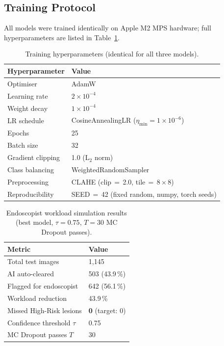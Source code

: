 \documentclass[11pt,a4paper]{article}
\begin{document}
\subsection{Training Protocol}
\label{sec:training}

All models were trained identically on Apple M2 MPS hardware; full
hyperparameters are listed in Table~\ref{tab:hparams}.

\begin{table}[H]
\centering
\caption{Training hyperparameters (identical for all three models).}
\label{tab:hparams}
\begin{tabular}{ll}
\toprule
\textbf{Hyperparameter} & \textbf{Value}\\
\midrule
Optimiser          & AdamW\\
Learning rate      & $2\times10^{-4}$\\
Weight decay       & $1\times10^{-4}$\\
LR schedule        & CosineAnnealingLR ($\eta_{\min}=1\times10^{-6}$)\\
Epochs             & 25\\
Batch size         & 32\\
Gradient clipping  & 1.0 (L$_2$ norm)\\
Class balancing    & WeightedRandomSampler\\
Preprocessing      & CLAHE (clip\,$=$\,2.0, tile\,$=$\,$8\times8$)\\
Reproducibility    & SEED\,$=$\,42 (fixed random, numpy, torch seeds)\\
\bottomrule
\end{tabular}
\end{table}

\begin{table}[H]
\centering
\caption{Endoscopist workload simulation results (best model, $\tau=0.75$, $T=30$ MC Dropout passes).}
\label{tab:workload}
\begin{tabular}{ll}
\toprule
\textbf{Metric} & \textbf{Value}\\
\midrule
Total test images          & 1,145\\
AI auto-cleared            & 503 (43.9\,\%)\\
Flagged for endoscopist    & 642 (56.1\,\%)\\
Workload reduction         & 43.9\,\%\\
Missed High-Risk lesions   & \textbf{0} \quad (target: 0)\\
Confidence threshold $\tau$ & 0.75\\
MC Dropout passes $T$      & 30\\
\bottomrule
\end{tabular}
\end{table}
\end{document}
